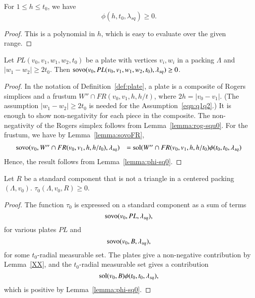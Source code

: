 \begin{lemma}\label{lemma:phi-sq0}
For $1\le h\le t_0$, we have
$$
\phi(h,t_0,\lambda_{sq})\ge 0.
$$
\end{lemma}

\begin{proof}
This is a polynomial in $h$, which is easy to evaluate over the
given range.
\end{proof}


\begin{lemma}\label{lemma:pl-sq0}
Let $PL(v_0,v_1,w_1,w_2,t_0)$ be a plate with
vertices $v_i,w_i$ in a packing $\Lambda$ and $|w_1-w_2|\ge 2 t_0$.
Then
${\operatorname{sovo}}(v_0,PL(v_0,v_1,w_1,w_2,t_0),\lambda_{sq}) \ge 0$. 
\end{lemma}

\begin{proof} In the notation of Definition~\ref{def:plate},
a plate is a composite of Rogers simplices and
a frustum $W''\cap FR(v_0,v_1,h,h/t)$,
where $2h = |v_0-v_1|$.  (The assumption $|w_1-w_2|\ge 2 t_0$
is needed for the Assumption~\ref{eqn:q1q2}.)
It is enough to show non-negativity for each piece in the composite.
The non-negativity of the Rogers simplex follows from Lemma~\ref{lemma:rog-squ0}.
For the frustum, we have by Lemma~\ref{lemma:sovoFR},
$$
\begin{array}{lll}
{\operatorname{sovo}}(v_0,W''\cap FR(v_0,v_1,h,h/t_0),\lambda_{sq}) &=
  \operatorname{sol}(W''\cap FR(v_0,v_1,h,h/t_0) \phi(t_0,t_0,\lambda_{sq})\\
\end{array}
$$
Hence, the result follows from Lemma~\ref{lemma:phi-sq0}.
\end{proof}


\begin{lemma}
    \label{lemma:tau-positive}
    Let $R$ be a standard component that is not a triangle in a
    centered packing $(\Lambda,v_0)$.
    $\tau_{0}(\Lambda,v_0,R)\ge 0$.
\end{lemma}

\begin{proof}
The function $\tau_0$ is expressed on a standard component as a sum
of terms
  $$
  {\operatorname{sovo}}(v_0,PL,\lambda_{sq}),
  $$
for various plates $PL$ and
   $$
   {\operatorname{sovo}}(v_0,B,\lambda_{sq}),
   $$
for some $t_0$-radial measurable set.
The plates give a non-negative contribution by Lemma~\ref{XX},
and the $t_0$-radial measurable set gives a contribution
   $$
   \operatorname{sol}(v_0,B)\phi(t_0,t_0,\lambda_{sq}),
   $$
which is positive by Lemma~\ref{lemma:phi-sq0}.
\end{proof}


